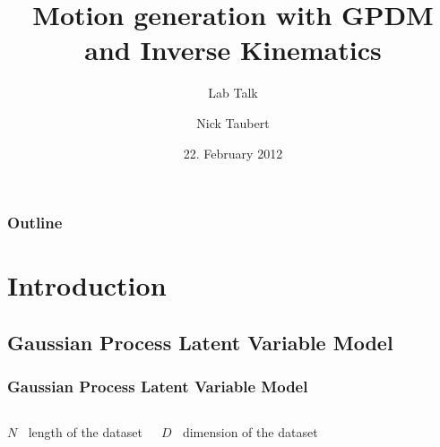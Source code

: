 \documentclass[10pt]{beamer}
\title[Motion generation with GPDM and Inverse Kinematics]{Motion generation with GPDM and Inverse Kinematics}
\subtitle{Lab Talk}
\author[N. Taubert]{Nick Taubert}
\date[22.02.12]{22. February 2012}
\begin{document}
\begin{frame}
  \titlepage
\end{frame}

\begin{frame}
  \frametitle{Outline}
  \tableofcontents[pausesections]
\end{frame}

\section{Introduction}
\subsection{Gaussian Process Latent Variable Model}
\begin{frame}
  \frametitle{Gaussian Process Latent Variable Model}
  \begin{columns}[c]
    \column{4.9cm}
	\tiny{\hspace{1cm}$N\mathop{\hat{=}}$ length of the dataset

	\hspace{1cm}$D\mathop{\hat{=}}$ dimension of the dataset

}
\end{columns}
\end{frame}
\end{document}
